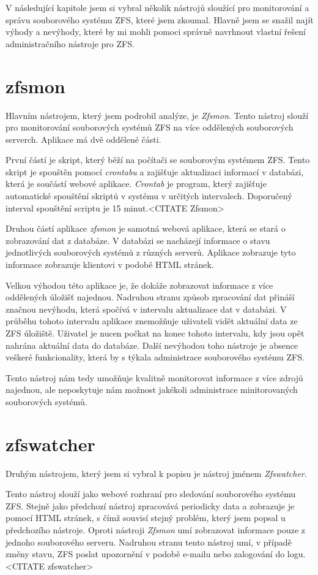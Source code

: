 V následující kapitole jsem si vybral několik nástrojů sloužící pro monitorování a správu souborového systému ZFS, které jsem zkoumal. Hlavně jsem se snažil najít výhody a nevýhody, které by mi mohli pomoci správně navrhnout vlastní řešení administračního nástroje pro ZFS.
\section{zfsmon}
Hlavním nástrojem, který jsem podrobil analýze, je \emph{Zfsmon}. Tento nástroj slouží pro monitorování souborových systémů ZFS na více oddělených souborových serverch. Aplikace má dvě oddělené části.

První částí je skript, který běží na počítači se souborovým systémem ZFS. Tento skript je spouštěn pomocí \emph{crontabu} a zajišťuje aktualizaci informací v databázi, která je součástí webové aplikace. \emph{Crontab} je program, který zajišťuje automatické spouštění skriptů v systému v určitých intervalech. Doporučený interval spouštění scriptu je 15 minut.<CITATE Zfsmon>

Druhou částí aplikace \emph{zfsmon} je samotná webová aplikace, která se stará o zobrazování dat z databáze. V databázi se nacházejí informace o stavu jednotlivých souborových systémů z různých serverů. Aplikace zobrazuje tyto informace zobrazuje klientovi v podobě HTML stránek.

Velkou výhodou této aplikace je, že dokáže zobrazovat informace z více oddělených úložišť najednou. Nadruhou stranu způsob zpracování dat přináší značnou nevýhodu, která spočívá v intervalu aktualizace dat v databázi. V průběhu tohoto intervalu aplikace znemožňuje uživateli vidět aktuální data ze ZFS úložiště. Uživatel je nucen počkat na konec tohoto intervalu, kdy jsou opět nahrána aktuální data do databáze. Další nevýhodou toho nástroje je absence veškeré funkcionality, která by s týkala administrace souborového systému ZFS.

Tento nástroj nám tedy umožňuje kvalitně monitorovat informace z více zdrojů najednou, ale neposkytuje nám možnost jakékoli administrace minitorovaných souborových systémů.
\section{zfswatcher}
Druhým nástrojem, který jsem si vybral k popisu je nástroj jménem \emph{Zfswatcher}.

Tento nástroj slouží jako webové rozhraní pro sledování souborového systému ZFS. Stejně jako předchozí nástroj zpracovává periodicky data a zobrazuje je pomocí HTML stránek, s čímž souvisí stejný problém, který jsem popsal u předchozího nástroje. Oproti nástroji \emph{Zfsmon} umí zobrazovat informace pouze z jednoho souborového serveru. Nadruhou stranu tento nástroj umí, v případě změny stavu, ZFS poslat upozornění v podobě e-mailu nebo zalogování do logu.<CITATE zfswatcher>

